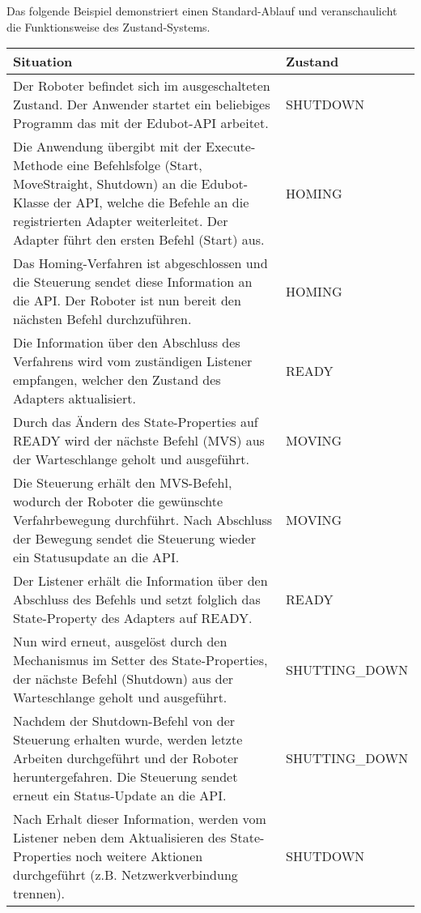 \newpage
Das folgende Beispiel demonstriert einen Standard-Ablauf und veranschaulicht die Funktionsweise des Zustand-Systems.
\newline
\newline
\begin{tabular}{|p{10cm}|p{4cm}|}
\hline \rowcolor{lightgray}
\textbf{Situation} & \textbf{Zustand}\\
\hline
Der Roboter befindet sich im ausgeschalteten Zustand. Der Anwender startet ein beliebiges Programm das mit der Edubot-API arbeitet. & SHUTDOWN\\
\hline
Die Anwendung übergibt mit der Execute-Methode eine Befehlsfolge (Start, MoveStraight, Shutdown) an die Edubot-Klasse der API, welche die Befehle an die registrierten Adapter weiterleitet. Der Adapter führt den ersten Befehl (Start) aus. & HOMING\\
\hline
Das Homing-Verfahren ist abgeschlossen und die Steuerung sendet diese Information an die API. Der Roboter ist nun bereit den nächsten Befehl durchzuführen. & HOMING\\
\hline
Die Information über den Abschluss des Verfahrens wird vom zuständigen Listener empfangen, welcher den Zustand des Adapters aktualisiert. & READY\\
\hline
Durch das Ändern des State-Properties auf READY wird der nächste Befehl (MVS) aus der Warteschlange geholt und ausgeführt. & MOVING\\
\hline
Die Steuerung erhält den MVS-Befehl, wodurch der Roboter die gewünschte Verfahrbewegung durchführt. Nach Abschluss der Bewegung sendet die Steuerung wieder ein Statusupdate an die API.	 & MOVING\\
\hline
Der Listener erhält die Information über den Abschluss des Befehls und setzt folglich das State-Property des Adapters auf READY. & READY\\
\hline
Nun wird erneut, ausgelöst durch den Mechanismus im Setter des State-Properties, der nächste Befehl (Shutdown) aus der Warteschlange geholt und ausgeführt. & SHUTTING\_DOWN\\
\hline
Nachdem der Shutdown-Befehl von der Steuerung erhalten wurde, werden letzte Arbeiten durchgeführt und der Roboter heruntergefahren. Die Steuerung sendet erneut ein Status-Update an die API. & SHUTTING\_DOWN\\
\hline
Nach Erhalt dieser Information, werden vom Listener neben dem Aktualisieren des State-Properties noch weitere Aktionen durchgeführt (z.B. Netzwerkverbindung trennen). & SHUTDOWN\\
\hline
\end{tabular}